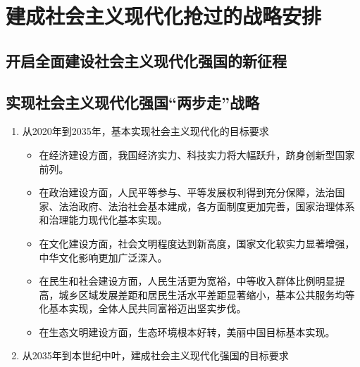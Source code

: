 \section{建成社会主义现代化抢过的战略安排}
    \subsection{开启全面建设社会主义现代化强国的新征程}
    \subsection{实现社会主义现代化强国“两步走”战略}
        \begin{enumerate}
            \item 从2020年到2035年，基本实现社会主义现代化的目标要求
            \begin{itemize}
                \item 在经济建设方面，我国经济实力、科技实力将大幅跃升，跻身创新型国家前列。
                \item 在政治建设方面，人民平等参与、平等发展权利得到充分保障，法治国家、法治政府、法治社会基本建成，各方面制度更加完善，国家治理体系和治理能力现代化基本实现。
                \item 在文化建设方面，社会文明程度达到新高度，国家文化软实力显著增强，中华文化影响更加广泛深入。
                \item 在民生和社会建设方面，人民生活更为宽裕，中等收入群体比例明显提高，城乡区域发展差距和居民生活水平差距显著缩小，基本公共服务均等化基本实现，全体人民共同富裕迈出坚实步伐。
                \item 在生态文明建设方面，生态环境根本好转，美丽中国目标基本实现。
            \end{itemize}
            \item 从2035年到本世纪中叶，建成社会主义现代化强国的目标要求
        \end{enumerate}
